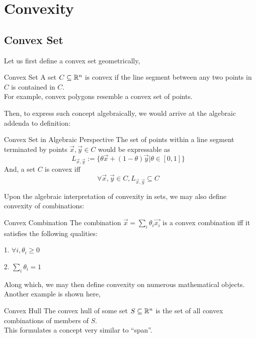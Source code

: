 \chapter{Convexity}

\section{Convex Set}
Let us first define a convex set geometrically,
\begin{ln-define}{Convex Set}{}
    A set $C \subseteq \mathbb{R}^n$ is convex if the line segment between any two points in $C$ is contained in $C$. \\
    For example, convex polygons resemble a convex set of points.
\end{ln-define}
Then, to express such concept algebraically, we would arrive at the algebraic addenda to definition:
\begin{ln-define}{Convex Set in Algebraic Perspective}{}
    The set of points within a line segment terminated by points $\vec{x}, \vec{y} \in C$ would be expressable as
    \[
        L_{\vec{x}, \vec{y}} := \{\theta \vec{x} + (1 - \theta) \vec{y} | \theta \in [0, 1]\}
    \]
    And, a set $C$ is convex iff
    \[
        \forall \vec{x}, \vec{y} \in C, L_{\vec{x}, \vec{y}} \subseteq C
    \]
\end{ln-define}

Upon the algebraic interpretation of convexity in sets, we may also define convexity of combinations:
\begin{ln-define}{Convex Combination}{}
    The combination $\vec{x} = \sum_i \theta_i \vec{x_i}$ is a convex combination iff it satisfies the following qualities:
    \begin{bindenum}
        \item[1.] $\forall i, \theta_i \geq 0$
        \item[2.] $\sum_i \theta_i = 1$
    \end{bindenum}
\end{ln-define}
Along which, we may then define convexity on numerous mathematical objects. Another example is shown here,
\begin{ln-define}{Convex Hull}{}
    The convex hull of some set $S \subseteq \mathbb{R}^n$ is the set of all convex combinations of members of $S$. \\
    This formulates a concept very similar to ``span''.
\end{ln-define}

